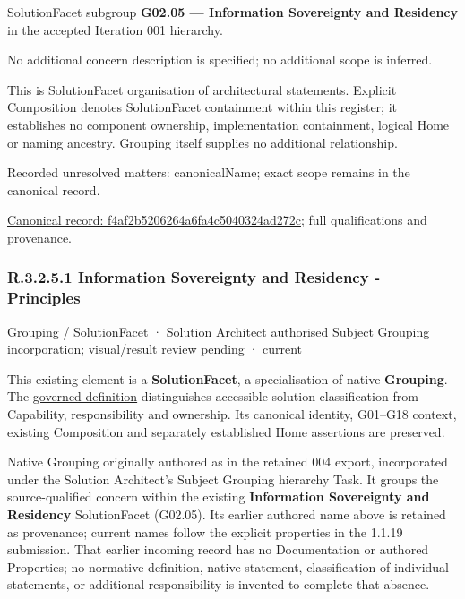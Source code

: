 SolutionFacet subgroup \textbf{G02.05 — Information Sovereignty and Residency} in the accepted Iteration 001 hierarchy.



No additional concern description is specified; no additional scope is inferred.



This is SolutionFacet organisation of architectural statements. Explicit Composition denotes SolutionFacet containment within this register; it establishes no component ownership, implementation containment, logical Home or naming ancestry. Grouping itself supplies no additional relationship.


{\small Recorded unresolved matters: canonicalName; exact scope remains in the canonical record.}\par
{\footnotesize \href{../../../../../../../continuum/grouping/f4af2b5206264a6fa4c5040324ad272c.md}{Canonical record: f4af2b5206264a6fa4c5040324ad272c}; full qualifications and provenance.}\par
\subsubsection*{R.3.2.5.1 Information Sovereignty and Residency - Principles}
\label{navigation:R.3.2.5.1}

\label{element:f6b8d4c19f9649a0bdde6727182855b6}
{\small Grouping / SolutionFacet · Solution Architect authorised Subject Grouping incorporation; visual/result review pending · current}\par

This existing element is a \textbf{SolutionFacet}, a specialisation of native
\textbf{Grouping}. The \href{\detokenize{../../../../../../../governance/continuum-representation.md#solutionfacet-classification--1119-candidate}}{governed definition}
distinguishes accessible solution classification from Capability, responsibility
and ownership. Its canonical identity, G01–G18 context, existing Composition
and separately established Home assertions are preserved.



Native Grouping originally authored as \texttt{} in the retained 004 export,
incorporated under the Solution Architect's Subject Grouping hierarchy Task.
It groups the source-qualified \texttt{} concern within
the existing \textbf{Information Sovereignty and Residency} SolutionFacet (G02.05). Its earlier authored name above is retained as provenance; current names
follow the explicit properties in the 1.1.19 submission.
That earlier incoming record has no Documentation or authored Properties; no normative
definition, native statement, classification of individual statements, or
additional responsibility is invented to complete that absence.




